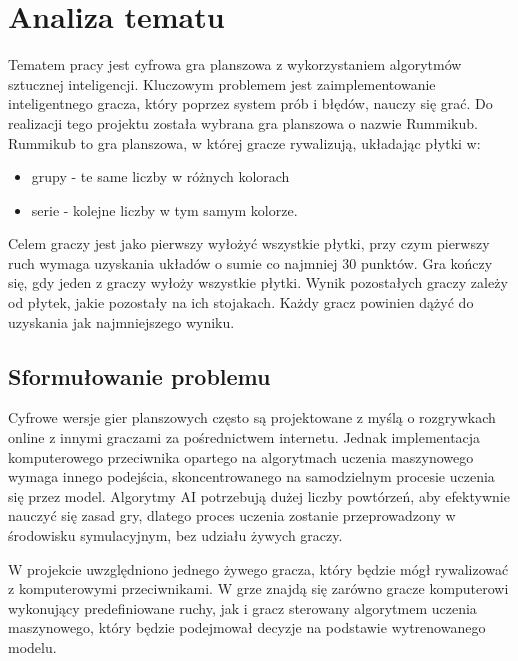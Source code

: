 \documentclass[a4paper,twoside,12pt]{book}
\begin{document}
	
	
	\chapter{Analiza tematu}%
	Tematem pracy jest cyfrowa gra planszowa z wykorzystaniem algorytmów sztucznej inteligencji. Kluczowym problemem jest zaimplementowanie inteligentnego gracza, który poprzez system prób i błędów, nauczy się grać. Do realizacji tego projektu została wybrana gra planszowa o nazwie Rummikub.\\ Rummikub to gra planszowa, w której gracze rywalizują, układając płytki w:
	\begin{itemize}
		\item grupy - te same liczby w różnych kolorach 
		\item serie - kolejne liczby w tym samym kolorze.
	\end{itemize} 
	Celem graczy jest jako pierwszy wyłożyć wszystkie płytki, przy czym pierwszy ruch wymaga uzyskania układów o sumie co najmniej 30 punktów. Gra kończy się, gdy jeden z graczy wyłoży wszystkie płytki. Wynik pozostałych graczy zależy od płytek, jakie pozostały na ich stojakach. Każdy gracz powinien dążyć do uzyskania jak najmniejszego wyniku.
	
	\section{Sformułowanie problemu}
	Cyfrowe wersje gier planszowych często są projektowane z myślą o rozgrywkach online z innymi graczami za pośrednictwem internetu. Jednak implementacja komputerowego przeciwnika opartego na algorytmach uczenia maszynowego wymaga innego podejścia, skoncentrowanego na samodzielnym procesie uczenia się przez model. Algorytmy AI potrzebują dużej liczby powtórzeń, aby efektywnie nauczyć się zasad gry, dlatego proces uczenia zostanie przeprowadzony w środowisku symulacyjnym, bez udziału żywych graczy.

	W projekcie uwzględniono jednego żywego gracza, który będzie mógł rywalizować z komputerowymi przeciwnikami. W grze znajdą się zarówno gracze komputerowi wykonujący predefiniowane ruchy, jak i gracz sterowany algorytmem uczenia maszynowego, który będzie podejmował decyzje na podstawie wytrenowanego modelu.
\end{document}
